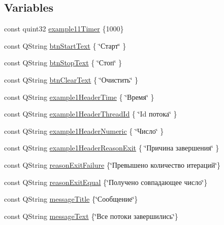 \subsection*{Variables}
\begin{DoxyCompactItemize}
\item 
const quint32 \hyperlink{namespaceexample_define_a0a1ec5a5c0128bb44325c0c336aada32}{example11\+Timer} \{1000\}
\item 
const Q\+String \hyperlink{namespaceexample_define_a4453a1a01e6af412bb1e5827536ae5f6}{btn\+Start\+Text} \{ \char`\"{}Старт\char`\"{} \}
\item 
const Q\+String \hyperlink{namespaceexample_define_a3d39e835a9b4c6da21942d4d38a77a13}{btn\+Stop\+Text} \{ \char`\"{}Стоп\char`\"{} \}
\item 
const Q\+String \hyperlink{namespaceexample_define_ad7fcdbb594190a717d729674bded61af}{btn\+Clear\+Text} \{ \char`\"{}Очистить\char`\"{} \}
\item 
const Q\+String \hyperlink{namespaceexample_define_a80786918ae4cb9b04251d42260a2eedb}{example1\+Header\+Time} \{ \char`\"{}Время\char`\"{} \}
\item 
const Q\+String \hyperlink{namespaceexample_define_aa002ede349a54aef5c34804433acd573}{example1\+Header\+Thread\+Id} \{ \char`\"{}Id потока\char`\"{} \}
\item 
const Q\+String \hyperlink{namespaceexample_define_ab74bf03fd1beb4afeafb6f635b2b9702}{example1\+Header\+Numeric} \{ \char`\"{}Число\char`\"{} \}
\item 
const Q\+String \hyperlink{namespaceexample_define_a1f9d60da016fe10b16feb7b99f24317f}{example1\+Header\+Reason\+Exit} \{ \char`\"{}Причина завершения\char`\"{} \}
\item 
const Q\+String \hyperlink{namespaceexample_define_a89fe16d6ba56c0ba051df9c91896803b}{reason\+Exit\+Failure} \{\char`\"{}Превышено количество итераций\char`\"{}\}
\item 
const Q\+String \hyperlink{namespaceexample_define_a9a9c6e2026d7e21a5f91f1247caf2a8a}{reason\+Exit\+Equal} \{\char`\"{}Получено совпадающее число\char`\"{}\}
\item 
const Q\+String \hyperlink{namespaceexample_define_a7b96f153422176efe4415c4c0b9434f6}{message\+Title} \{\char`\"{}Сообщение\char`\"{}\}
\item 
const Q\+String \hyperlink{namespaceexample_define_a8a0839e0a0b58d9719b0126a7a55872e}{message\+Text} \{\char`\"{}Все потоки завершились\char`\"{}\}
\end{DoxyCompactItemize}


